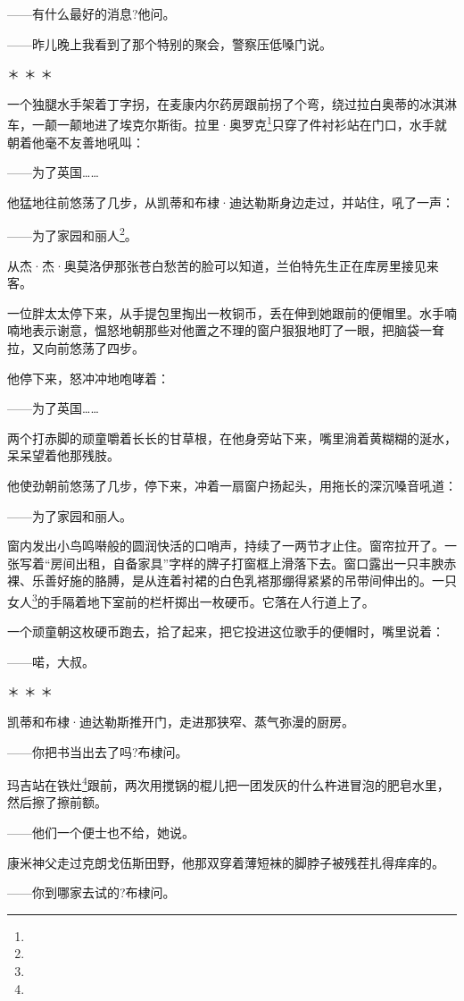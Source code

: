 \par ——有什么最好的消息?他问。
\par ——昨儿晚上我看到了那个特别的聚会，警察压低嗓门说。
\par ＊ ＊ ＊
\par 一个独腿水手架着丁字拐，在麦康内尔药房跟前拐了个弯，绕过拉白奥蒂的冰淇淋车，一颠一颠地进了埃克尔斯街。拉里·奥罗克\footnote{}只穿了件衬衫站在门口，水手就朝着他毫不友善地吼叫：
\par ——为了英国……
\par 他猛地往前悠荡了几步，从凯蒂和布棣·迪达勒斯身边走过，并站住，吼了一声：
\par ——为了家园和丽人\footnote{}。
\par 从杰·杰·奥莫洛伊那张苍白愁苦的脸可以知道，兰伯特先生正在库房里接见来客。
\par 一位胖太太停下来，从手提包里掏出一枚铜币，丢在伸到她跟前的便帽里。水手喃喃地表示谢意，愠怒地朝那些对他置之不理的窗户狠狠地盯了一眼，把脑袋一耷拉，又向前悠荡了四步。
\par 他停下来，怒冲冲地咆哮着：
\par ——为了英国……
\par 两个打赤脚的顽童嚼着长长的甘草根，在他身旁站下来，嘴里淌着黄糊糊的涎水，呆呆望着他那残肢。
\par 他使劲朝前悠荡了几步，停下来，冲着一扇窗户扬起头，用拖长的深沉嗓音吼道：
\par ——为了家园和丽人。
\par 窗内发出小鸟鸣啭般的圆润快活的口哨声，持续了一两节才止住。窗帘拉开了。一张写着“房间出租，自备家具”字样的牌子打窗框上滑落下去。窗口露出一只丰腴赤裸、乐善好施的胳膊，是从连着衬裙的白色乳褡那绷得紧紧的吊带间伸出的。一只女人\footnote{}的手隔着地下室前的栏杆掷出一枚硬币。它落在人行道上了。
\par 一个顽童朝这枚硬币跑去，拾了起来，把它投进这位歌手的便帽时，嘴里说着：
\par ——喏，大叔。
\par ＊ ＊ ＊
\par 凯蒂和布棣·迪达勒斯推开门，走进那狭窄、蒸气弥漫的厨房。
\par ——你把书当出去了吗?布棣问。
\par 玛吉站在铁灶\footnote{}跟前，两次用搅锅的棍儿把一团发灰的什么杵进冒泡的肥皂水里，然后擦了擦前额。
\par ——他们一个便士也不给，她说。
\par 康米神父走过克朗戈伍斯田野，他那双穿着薄短袜的脚脖子被残茬扎得痒痒的。
\par ——你到哪家去试的?布棣问。
